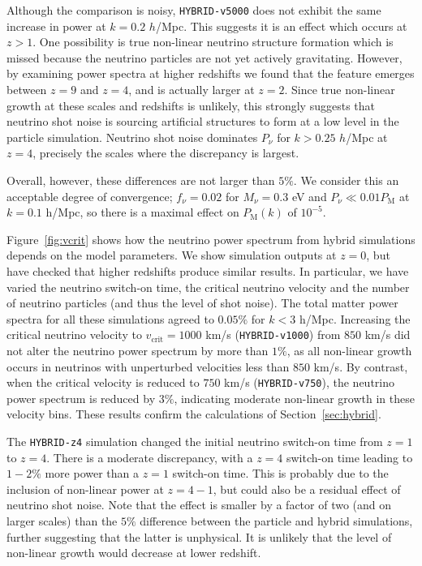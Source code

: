 \documentclass[useAMS, usenatbib]{mnras}
\begin{document}
Although the comparison is noisy, \texttt{HYBRID-v5000} does not exhibit the same increase in power at $k=0.2$ $h$/Mpc. This suggests it is an effect which occurs at $z > 1$. One possibility is true non-linear neutrino structure formation which is missed because the neutrino particles are not yet actively gravitating. However, by examining power spectra at higher redshifts we found that the feature emerges between $z=9$ and $z=4$, and is actually larger at $z=2$. Since true non-linear growth at these scales and redshifts is unlikely, this strongly suggests that neutrino shot noise is sourcing artificial structures to form at a low level in the particle simulation. Neutrino shot noise dominates $P_\nu$ for $k > 0.25$ $h$/Mpc at $z=4$, precisely the scales where the discrepancy is largest.

Overall, however, these differences are not larger than $5\%$. We consider this an acceptable degree of convergence; $f_\nu = 0.02$ for $M_\nu = 0.3$ eV and $P_\nu \ll 0.01 P_\mathrm{M}$ at $k = 0.1$ h/Mpc, so there is a maximal effect on $P_\mathrm{M}(k)$ of $10^{-5}$.

Figure~\ref{fig:vcrit} shows how the neutrino power spectrum from hybrid simulations depends on the model parameters. We show simulation outputs at $z=0$, but have checked that higher redshifts produce similar results. In particular, we have varied the neutrino switch-on time, the critical neutrino velocity and the number of neutrino particles (and thus the level of shot noise). The total matter power spectra for all these simulations agreed to $0.05\%$ for $k < 3$ h/Mpc. Increasing the critical neutrino velocity to $v_\mathrm{crit} = 1000$ km/s (\texttt{HYBRID-v1000}) from $850$ km/s did not alter the neutrino power spectrum by more than $1\%$, as all non-linear growth occurs in neutrinos with unperturbed velocities less than $850$ km/s. By contrast, when the critical velocity is reduced to $750$ km/s (\texttt{HYBRID-v750}), the neutrino power spectrum is reduced by $3\%$, indicating moderate non-linear growth in these velocity bins. These results confirm the calculations of Section~\ref{sec:hybrid}.

The \texttt{HYBRID-z4} simulation changed the initial neutrino switch-on time from $z=1$ to $z=4$. There is a moderate discrepancy, with a $z=4$ switch-on time leading to $1-2\%$ more power than a $z=1$ switch-on time. This is probably due to the inclusion of non-linear power at $z = 4-1$, but could also be a residual effect of neutrino shot noise. Note that the effect is smaller by a factor of two (and on larger scales) than the $5\%$ difference between the particle and hybrid simulations, further suggesting that the latter is unphysical. It is unlikely that the level of non-linear growth would decrease at lower redshift.
\end{document}
